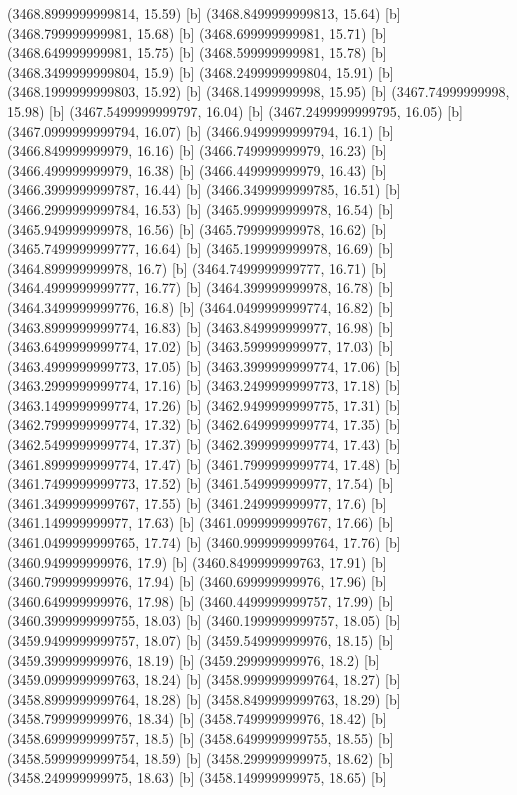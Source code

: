 {{{(3468.8999999999814, 15.59) [b] 
(3468.8499999999813, 15.64) [b] 
(3468.799999999981, 15.68) [b] 
(3468.699999999981, 15.71) [b] 
(3468.649999999981, 15.75) [b] 
(3468.599999999981, 15.78) [b] 
(3468.3499999999804, 15.9) [b] 
(3468.2499999999804, 15.91) [b] 
(3468.1999999999803, 15.92) [b] 
(3468.14999999998, 15.95) [b] 
(3467.74999999998, 15.98) [b] 
(3467.5499999999797, 16.04) [b] 
(3467.2499999999795, 16.05) [b] 
(3467.0999999999794, 16.07) [b] 
(3466.9499999999794, 16.1) [b] 
(3466.849999999979, 16.16) [b] 
(3466.749999999979, 16.23) [b] 
(3466.499999999979, 16.38) [b] 
(3466.449999999979, 16.43) [b] 
(3466.3999999999787, 16.44) [b] 
(3466.3499999999785, 16.51) [b] 
(3466.2999999999784, 16.53) [b] 
(3465.999999999978, 16.54) [b] 
(3465.949999999978, 16.56) [b] 
(3465.799999999978, 16.62) [b] 
(3465.7499999999777, 16.64) [b] 
(3465.199999999978, 16.69) [b] 
(3464.899999999978, 16.7) [b] 
(3464.7499999999777, 16.71) [b] 
(3464.4999999999777, 16.77) [b] 
(3464.399999999978, 16.78) [b] 
(3464.3499999999776, 16.8) [b] 
(3464.0499999999774, 16.82) [b] 
(3463.8999999999774, 16.83) [b] 
(3463.849999999977, 16.98) [b] 
(3463.6499999999774, 17.02) [b] 
(3463.599999999977, 17.03) [b] 
(3463.4999999999773, 17.05) [b] 
(3463.3999999999774, 17.06) [b] 
(3463.2999999999774, 17.16) [b] 
(3463.2499999999773, 17.18) [b] 
(3463.1499999999774, 17.26) [b] 
(3462.9499999999775, 17.31) [b] 
(3462.7999999999774, 17.32) [b] 
(3462.6499999999774, 17.35) [b] 
(3462.5499999999774, 17.37) [b] 
(3462.3999999999774, 17.43) [b] 
(3461.8999999999774, 17.47) [b] 
(3461.7999999999774, 17.48) [b] 
(3461.7499999999773, 17.52) [b] 
(3461.549999999977, 17.54) [b] 
(3461.3499999999767, 17.55) [b] 
(3461.249999999977, 17.6) [b] 
(3461.149999999977, 17.63) [b] 
(3461.0999999999767, 17.66) [b] 
(3461.0499999999765, 17.74) [b] 
(3460.9999999999764, 17.76) [b] 
(3460.949999999976, 17.9) [b] 
(3460.8499999999763, 17.91) [b] 
(3460.799999999976, 17.94) [b] 
(3460.699999999976, 17.96) [b] 
(3460.649999999976, 17.98) [b] 
(3460.4499999999757, 17.99) [b] 
(3460.3999999999755, 18.03) [b] 
(3460.1999999999757, 18.05) [b] 
(3459.9499999999757, 18.07) [b] 
(3459.549999999976, 18.15) [b] 
(3459.399999999976, 18.19) [b] 
(3459.299999999976, 18.2) [b] 
(3459.0999999999763, 18.24) [b] 
(3458.9999999999764, 18.27) [b] 
(3458.8999999999764, 18.28) [b] 
(3458.8499999999763, 18.29) [b] 
(3458.799999999976, 18.34) [b] 
(3458.749999999976, 18.42) [b] 
(3458.6999999999757, 18.5) [b] 
(3458.6499999999755, 18.55) [b] 
(3458.5999999999754, 18.59) [b] 
(3458.299999999975, 18.62) [b] 
(3458.249999999975, 18.63) [b] 
(3458.149999999975, 18.65) [b] 
}}}
